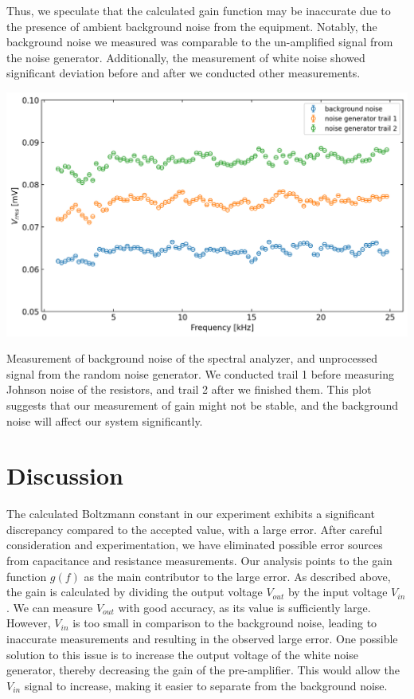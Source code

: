 \documentclass[a4paper]{tufte-handout}
\begin{document}
Thus, we speculate that the calculated gain function may be inaccurate due to the presence of ambient background noise from the equipment. Notably, the background noise we measured was comparable to the un-amplified signal from the noise generator. Additionally, the measurement of white noise showed significant deviation before and after we conducted other measurements.

\begin{center}
    \includegraphics[width = 1\textwidth]{figures/noise_gen.png}
    \caption {Measurement of background noise of the spectral analyzer, and unprocessed signal from the random noise generator. We conducted trail 1 before measuring Johnson noise of the resistors, and trail 2 after we finished them. This plot suggests that our measurement of gain might not be stable, and the background noise will affect our system significantly.}\label{fig:noise_gen}
\end{center}





\newpage
\section{Discussion}

\quad The calculated Boltzmann constant in our experiment exhibits a significant discrepancy compared to the accepted value, with a large error. After careful consideration and experimentation, we have eliminated possible error sources from capacitance and resistance measurements. Our analysis points to the gain function $g(f)$ as the main contributor to the large error. As described above, the gain is calculated by dividing the output voltage $V_{out}$ by the input voltage $V_{in}$. We can measure $V_{out}$ with good accuracy, as its value is sufficiently large. However, $V_{in}$ is too small in comparison to the background noise, leading to inaccurate measurements and resulting in the observed large error. One possible solution to this issue is to increase the output voltage of the white noise generator, thereby decreasing the gain of the pre-amplifier. This would allow the $V_{in}$ signal to increase, making it easier to separate from the background noise.




% 
% 
\end{document}
